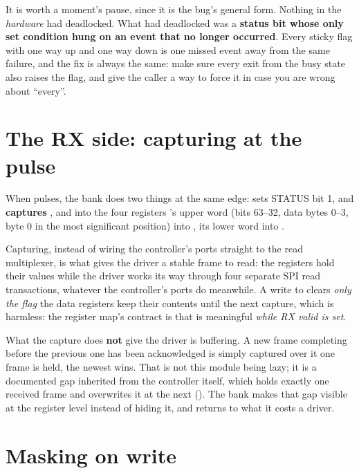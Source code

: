 It is worth a moment's pause, since it is the bug's general form. Nothing in the \emph{hardware} had
deadlocked. What had deadlocked was a \textbf{status bit whose only set condition hung on an event
that no longer occurred}. Every sticky flag with one way up and one way down is one missed event away
from the same failure, and the fix is always the same: make sure every exit from the busy state also
raises the flag, and give the caller a way to force it in case you are wrong about ``every''.

\section{The RX side: capturing at the pulse}
\label{c18:sec:rx}

When  pulses, the bank does two things at the same edge: sets STATUS bit 1, and
\textbf{captures} ,  and  into the four  registers
\textemdash{} 's upper word (bits 63--32, data bytes 0--3, byte 0 in the most
significant position) into , its lower word into .

Capturing, instead of wiring the controller's ports straight to the read multiplexer, is what gives
the driver a stable frame to read: the  registers hold their values while the driver works
its way through four separate SPI read transactions, whatever the controller's ports do meanwhile. A
write to  clears \emph{only the flag} \textemdash{} the data registers keep their
contents until the next capture, which is harmless: the register map's contract is that  is
meaningful \emph{while RX valid is set}.

What the capture does \textbf{not} give the driver is buffering. A new frame completing before the
previous one has been acknowledged is simply captured over it \textemdash{} one frame is held, the
newest wins. That is not this module being lazy; it is a documented gap inherited from the controller
itself, which holds exactly one received frame and overwrites it at the next (). The
bank makes that gap visible at the register level instead of hiding it, and  returns
to what it costs a driver.

\section{Masking on write}
\label{c18:sec:mask}

